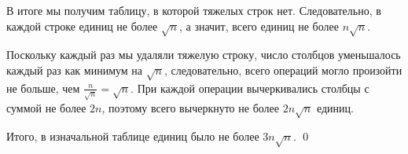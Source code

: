		В итоге мы получим таблицу, в которой тяжелых строк нет. Следовательно, в каждой строке единиц не более $\sqrt{n}$, а значит, всего единиц не более $n \sqrt{n}$.

		Поскольку каждый раз мы удаляли тяжелую строку, число столбцов уменьшалось каждый раз как минимум на $\sqrt{n}$, следовательно, всего операций могло произойти не больше, чем $\frac{n}{\sqrt{n}} = \sqrt{n}$. При каждой операции вычеркивались столбцы с суммой не более $2n$, поэтому всего вычеркнуто не более $2n \sqrt{n}$ единиц.

		Итого, в изначальной таблице единиц было не более $3n \sqrt{n}$. \qed


